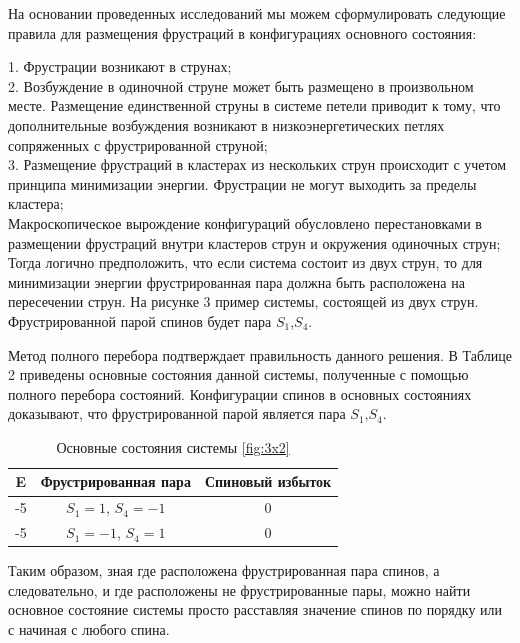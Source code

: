 \documentclass[utf8, babel, sor, jor, amsmath, amssymb, reprint]{elsarticle} %
\begin{document}
На основании проведенных исследований мы можем сформулировать следующие правила для размещения фрустраций в конфигурациях основного состояния:
 
1. Фрустрации возникают в струнах;\\

2. Возбуждение в одиночной струне может быть размещено в произвольном месте. Размещение единственной струны в системе петели  приводит к тому, что дополнительные возбуждения возникают в низкоэнергетических петлях сопряженных с фрустрированной струной;\\  

3. Размещение фрустраций в кластерах из нескольких струн происходит с учетом принципа минимизации энергии. Фрустрации не могут выходить за пределы кластера;\\

Макроскопическое вырождение конфигураций обусловлено перестановками в размещении фрустраций внутри кластеров струн и окружения одиночных струн;\\  




Тогда логично предположить, что если система состоит из двух струн, то для минимизации энергии фрустрированная пара должна быть расположена на пересечении струн. На рисунке 3 пример системы, состоящей из двух струн. Фрустрированной парой спинов будет пара $S_1$,$S_4$.



Метод полного перебора подтверждает правильность данного решения. В Таблице 2 приведены основные состояния данной системы, полученные с помощью полного перебора состояний. Конфигурации спинов в основных состояниях доказывают, что фрустрированной парой является пара $S_1$,$S_4$. 

\begin{table}[h]
	\centering
	\begin{tabular}{|c|c|c|}
		\hline
		 E   &   Фрустрированная пара & Спиновый избыток\\
		 \hline
		-5   &  $S_1=1$, $S_4=-1$ & 0 \\
		\hline
		-5   &   $S_1=-1$, $S_4=1$ & 0 \\
		\hline
	\end{tabular}
	\caption{Основные состояния системы \eqref{fig:3x2} }
	\label{tab:gs}
\end{table}

Таким образом, зная где расположена фрустрированная пара спинов, а следовательно, и где расположены не фрустрированные пары, можно найти основное состояние системы просто расставляя значение спинов по порядку или с начиная с любого спина. 
\end{document}
